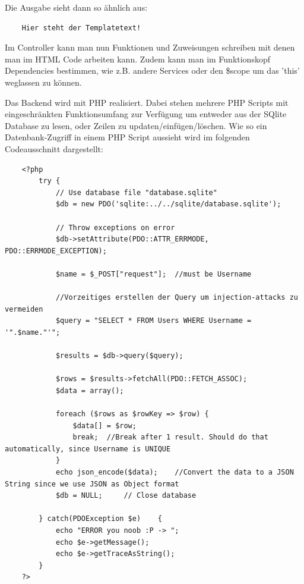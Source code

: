 \documentclass[11pt,a4paper]{article} %
\begin{document}
Die Ausgabe sieht dann so ähnlich aus:
\begin{frame}

\begin{lstlisting}
	Hier steht der Templatetext!
\end{lstlisting}
\end{frame}

Im Controller kann man nun Funktionen und Zuweisungen schreiben mit denen man im HTML Code arbeiten kann. Zudem kann man im Funktionskopf Dependencies bestimmen, wie z.B. andere Services oder den \$scope um das 'this' weglassen zu können.

Das Backend wird mit PHP realisiert. \cite{21} Dabei stehen mehrere PHP Scripts mit eingeschränkten Funktionsumfang zur Verfügung um entweder aus der SQlite Database zu lesen, oder Zeilen zu updaten/einfügen/löschen. Wie so ein Datenbank-Zugriff in einem PHP Script aussieht wird im folgenden Codeausschnitt dargestellt:

\begin{frame}

\begin{lstlisting}
	<?php
		try {
		    // Use database file "database.sqlite" 
		    $db = new PDO('sqlite:../../sqlite/database.sqlite');
		    
		    // Throw exceptions on error
		    $db->setAttribute(PDO::ATTR_ERRMODE, PDO::ERRMODE_EXCEPTION);

		    $name = $_POST["request"];	//must be Username

		    //Vorzeitiges erstellen der Query um injection-attacks zu vermeiden
		    $query = "SELECT * FROM Users WHERE Username = '".$name."'";

			$results = $db->query($query);

			$rows = $results->fetchAll(PDO::FETCH_ASSOC);
			$data = array();

			foreach ($rows as $rowKey => $row) {
				$data[] = $row;
				break;	//Break after 1 result. Should do that automatically, since Username is UNIQUE
			}
			echo json_encode($data);	//Convert the data to a JSON String since we use JSON as Object format
		    $db = NULL;		// Close database

		} catch(PDOException $e) 	{
		    echo "ERROR you noob :P -> ";
		    echo $e->getMessage();
		    echo $e->getTraceAsString();
		}
	?>	
\end{lstlisting}
\end{frame}
\end{document}
